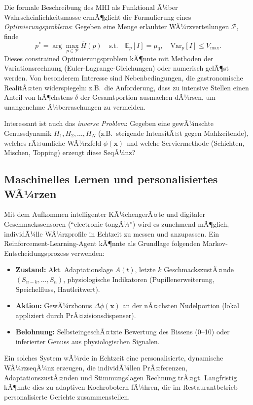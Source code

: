 ﻿\documentclass[12pt,a4paper]{article}
\theoremstyle{definition}
\newcommand{\E}{\mathbb{E}}
\newcommand{\Var}{\mathrm{Var}}
\newcommand{\bx}{\mathbf{x}}
\newcommand{\MHI}{\overline{H}}
\begin{document}
Die formale Beschreibung des MHI als Funktional Ã¼ber Wahrscheinlichkeitsmasse
ermÃ¶glicht die Formulierung eines \emph{Optimierungsproblems}: Gegeben eine
Menge erlaubter WÃ¼rzverteilungen $\mathcal{P}$, finde
\[
  p^* = \arg\max_{p \in \mathcal{P}} \MHI(p)
  \quad \text{s.t.} \quad \E_p[I] = \mu_0, \quad \Var_p[I] \leq V_{\max}.
\]
Dieses constrained Optimierungsproblem kÃ¶nnte mit Methoden der
Variationsrechnung (Euler-Lagrange-Gleichungen) oder numerisch gelÃ¶st
werden. Von besonderem Interesse sind Nebenbedingungen, die
gastronomische RealitÃ¤ten widerspiegeln: z.B.\ die Anforderung, dass
zu intensive Stellen einen Anteil von hÃ¶chstens $\delta$ der Gesamtportion
ausmachen dÃ¼rsen, um unangenehme Ã¼berraschungen zu vermeiden.

Interessant ist auch das \emph{inverse Problem}: Gegeben eine gewÃ¼nschte
Genussdynamik $H_1, H_2, \ldots, H_N$ (z.B.\ steigende IntensitÃ¤t gegen
Mahlzeitende), welches rÃ¤umliche WÃ¼rzfeld $\phi(\bx)$ und welche
Serviermethode (Schichten, Mischen, Topping) erzeugt diese SeqÃ¼nz?

\subsection{Maschinelles Lernen und personalisiertes WÃ¼rzen}

Mit dem Aufkommen intelligenter KÃ¼chengerÃ¤te und digitaler
Geschmackssensoren (``electronic tongÃ¼'') wird es zunehmend mÃ¶glich,
individÃ¼lle WÃ¼rzprofile in Echtzeit zu messen und anzupassen. Ein
Reinforcement-Learning-Agent kÃ¶nnte als Grundlage folgenden
Markov-Entscheidungsprozess verwenden:
\begin{itemize}
  \item \textbf{Zustand:} Akt. Adaptationslage $A(t)$, letzte $k$
    GeschmackszustÃ¤nde $(S_{n-k}, \ldots, S_n)$, physiologische
    Indikatoren (Pupillenerweiterung, Speichelfluss, Hautleitwert).
  \item \textbf{Aktion:} GewÃ¼rzbonus $\Delta\phi(\bx)$ an der nÃ¤chsten
    Nudelportion (lokal appliziert durch PrÃ¤zisionsdispenser).
  \item \textbf{Belohnung:} SelbsteingeschÃ¤tzte Bewertung des Bissens
    (0--10) oder inferierter Genuss aus physiologischen Signalen.
\end{itemize}
Ein solches System wÃ¼rde in Echtzeit eine personalisierte, dynamische
WÃ¼rzseqÃ¼nz erzeugen, die individÃ¼llen PrÃ¤ferenzen, AdaptationszustÃ¤nden
und Stimmungslagen Rechnung trÃ¤gt. Langfristig kÃ¶nnte dies zu adaptiven
Kochrobotern fÃ¼hren, die im Restaurantbetrieb personalisierte Gerichte
zusammenstellen.
\end{document}
